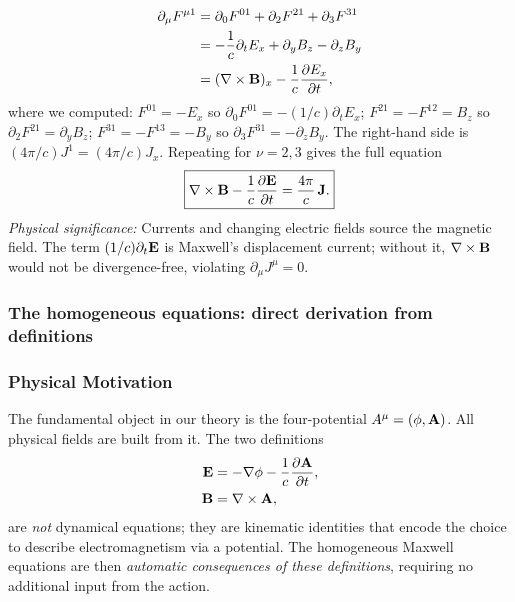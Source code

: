\begin{align}
  \partial_\mu F^{\mu 1}
  &=
  \partial_0 F^{01}
  +\partial_2 F^{21}
  +\partial_3 F^{31}
  \notag\\
  &=
  -\frac{1}{c}\partial_t E_x
  +\partial_y B_z
  -\partial_z B_y
  \notag\\
  &=
  (\nabla\times\mathbf{B})_x - \frac{1}{c}\frac{\partial E_x}{\partial t},
  \label{eq:lec10:ampere-x-lhs}
\end{align}
where we computed:
$F^{01}=-E_x$ so $\partial_0 F^{01} = -(1/c)\partial_t E_x$;
$F^{21}=-F^{12}=B_z$ so $\partial_2 F^{21}=\partial_y B_z$;
$F^{31}=-F^{13}=-B_y$ so $\partial_3 F^{31}=-\partial_z B_y$.
The right-hand side is $(4\pi/c)J^1=(4\pi/c)J_x$.  Repeating for $\nu=2,3$ gives the full equation
\begin{equation}\label{eq:lec10:ampere}
  \boxed{
  \nabla\times\mathbf{B} - \frac{1}{c}\frac{\partial\mathbf{E}}{\partial t}
  =
  \frac{4\pi}{c}\,\mathbf{J} .
  }
\end{equation}
\textit{Physical significance:} Currents and changing electric fields source the magnetic field.  The
term $(1/c)\partial_t\mathbf{E}$ is Maxwell's displacement current; without it, $\nabla\times\mathbf{B}$ would not
be divergence-free, violating $\partial_\mu J^\mu=0$.

\subsubsection*{The homogeneous equations: direct derivation from definitions}

\subsubsection*{Physical Motivation}
The fundamental object in our theory is the four-potential $A^\mu=(\phi,\mathbf{A})$.  All physical fields
are built from it.  The two definitions
\begin{align}
  \mathbf{E} &= -\nabla\phi - \frac{1}{c}\frac{\partial\mathbf{A}}{\partial t}, \label{eq:lec10:E-def}\\
  \mathbf{B} &= \nabla\times\mathbf{A}, \label{eq:lec10:B-def}
\end{align}
are \emph{not} dynamical equations; they are kinematic identities that encode the choice to describe
electromagnetism via a potential.  The homogeneous Maxwell equations are then \emph{automatic
consequences of these definitions}, requiring no additional input from the action.

